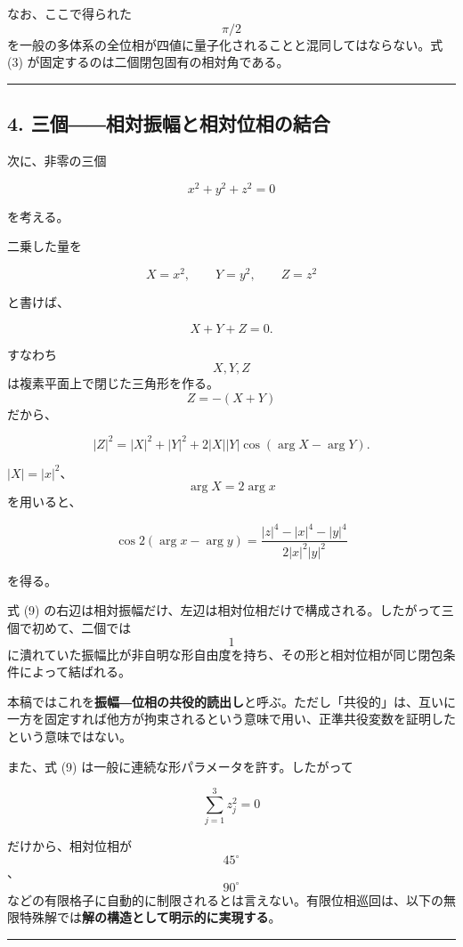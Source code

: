 \documentclass[
  a4paper,
]{ltjsarticle}
\begin{document}
なお、ここで得られた \[\pi/2\]
を一般の多体系の全位相が四値に量子化されることと混同してはならない。式
(3) が固定するのは二個閉包固有の相対角である。

\begin{center}\rule{0.5\linewidth}{0.5pt}\end{center}

\subsection{4.
三個――相対振幅と相対位相の結合}\label{ux4e09ux500bux76f8ux5bfeux632fux5e45ux3068ux76f8ux5bfeux4f4dux76f8ux306eux7d50ux5408}

次に、非零の三個

\[
x^2+y^2+z^2=0
\tag{7}
\]

を考える。

二乗した量を

\[
X=x^2,
\qquad
Y=y^2,
\qquad
Z=z^2
\]

と書けば、

\[
X+Y+Z=0.
\tag{8}
\]

すなわち \[X,Y,Z\] は複素平面上で閉じた三角形を作る。\[Z=-(X+Y)\]
だから、

\[
|Z|^2
=
|X|^2+|Y|^2
+2|X||Y|\cos(\arg X-\arg Y).
\]

\(|X|=|x|^2\)、\[\arg X=2\arg x\] を用いると、

\[
\boxed{
\cos 2(\arg x-\arg y)
=
\frac{|z|^4-|x|^4-|y|^4}
{2|x|^2|y|^2}
}
\tag{9}
\]

を得る。

式 (9)
の右辺は相対振幅だけ、左辺は相対位相だけで構成される。したがって三個で初めて、二個では
\[1\]
に潰れていた振幅比が非自明な形自由度を持ち、その形と相対位相が同じ閉包条件によって結ばれる。

本稿ではこれを\textbf{振幅―位相の共役的読出し}と呼ぶ。ただし「共役的」は、互いに一方を固定すれば他方が拘束されるという意味で用い、正準共役変数を証明したという意味ではない。

また、式 (9) は一般に連続な形パラメータを許す。したがって

\[
\sum_{j=1}^{3}z_j^2=0
\]

だけから、相対位相が \[45^\circ\]、\[90^\circ\]
などの有限格子に自動的に制限されるとは言えない。有限位相巡回は、以下の無限特殊解では\textbf{解の構造として明示的に実現する}。

\begin{center}\rule{0.5\linewidth}{0.5pt}\end{center}
\end{document}
